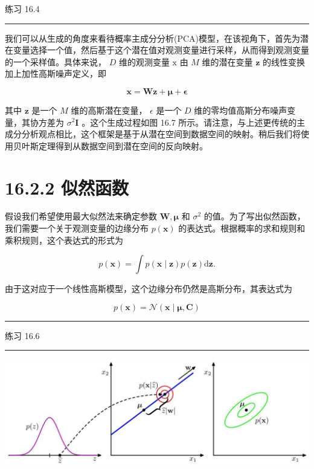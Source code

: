 \documentclass[10pt]{report}
\newcommand{\HRule}{\begin{center}\rule{0.9\linewidth}{0.2mm}\end{center}}
\begin{document}
练习 16.4

\HRule

我们可以从生成的角度来看待概率主成分分析(PCA)模型，在该视角下，首先为潜在变量选择一个值，然后基于这个潜在值对观测变量进行采样，从而得到观测变量的一个采样值。具体来说， \(D\) 维的观测变量 \(\mathrm{x}\) 由 \(M\) 维的潜在变量 \(\mathbf{z}\) 的线性变换加上加性高斯噪声定义，即

\[
\mathbf{x} = \mathbf{W}\mathbf{z} + \mathbf{\mu } + \mathbf{\epsilon } \tag{16.33}
\]

其中 \(\mathbf{z}\) 是一个 \(M\) 维的高斯潜在变量， \(\epsilon\) 是一个 \(D\) 维的零均值高斯分布噪声变量，其协方差为 \({\sigma }^{2}\mathbf{I}\) 。这个生成过程如图 16.7 所示。请注意，与上述更传统的主成分分析观点相比，这个框架是基于从潜在空间到数据空间的映射。稍后我们将使用贝叶斯定理得到从数据空间到潜在空间的反向映射。

\section*{16.2.2 似然函数}

假设我们希望使用最大似然法来确定参数 \(\mathbf{W},\mathbf{\mu }\) 和 \({\sigma }^{2}\) 的值。为了写出似然函数，我们需要一个关于观测变量的边缘分布 \(p\left( \mathbf{x}\right)\) 的表达式。根据概率的求和规则和乘积规则，这个表达式的形式为

\[
p\left( \mathbf{x}\right)  = \int p\left( {\mathbf{x} \mid  \mathbf{z}}\right) p\left( \mathbf{z}\right) \mathrm{d}\mathbf{z}. \tag{16.34}
\]

由于这对应于一个线性高斯模型，这个边缘分布仍然是高斯分布，其表达式为

\[
p\left( \mathbf{x}\right)  = \mathcal{N}\left( {\mathbf{x} \mid  \mathbf{\mu },\mathbf{C}}\right)  \tag{16.35}
\]

\HRule

练习 16.6

\HRule

\begin{center}
\includegraphics[max width=1.0\textwidth]{images/0194e279-9b28-703a-88f4-c3ac21e2010d_527_262_343_1275_439_0.jpg}
\end{center}
\hspace*{3em} 
\end{document}
